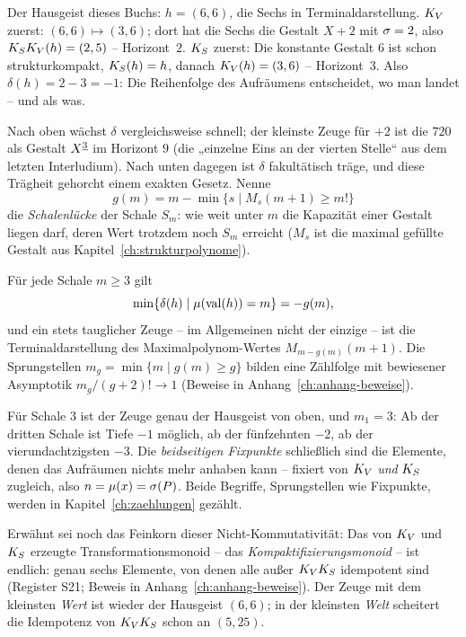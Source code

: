\begin{beispiel}
Der Hausgeist dieses Buchs: $h=(6,6)$, die Sechs in
Terminaldarstellung. $K_V$ zuerst: $(6,6)\mapsto(3,6)$; dort hat
die Sechs die Gestalt $X{+}2$ mit $\sigma=2$, also
$K_SK_V(h)=(2,5)$ -- Horizont~$2$. $K_S$ zuerst: Die konstante
Gestalt $6$ ist schon strukturkompakt, $K_S(h)=h$, danach
$K_V(h)=(3,6)$ -- Horizont~$3$. Also $\delta(h)=2-3=-1$: Die
Reihenfolge des Aufräumens entscheidet, wo man landet -- und als
was.
\end{beispiel}

Nach oben wächst $\delta$ vergleichsweise schnell; der kleinste
Zeuge für $+2$ ist die $720$ als Gestalt $X^{\underline{3}}$ im Horizont $9$
(die „einzelne Eins an der vierten Stelle“ aus dem letzten
Interludium). Nach unten dagegen ist $\delta$ fakultätisch träge,
und diese Trägheit gehorcht einem exakten Gesetz. Nenne
\[
g(m)=m-\min\{s\mid M_s(m{+}1)\ge m!\}
\]
die \emph{Schalenlücke} der Schale $S_m$: wie weit unter $m$ die
Kapazität einer Gestalt liegen darf, deren Wert trotzdem noch $S_m$
erreicht ($M_s$ ist die maximal gefüllte Gestalt aus
Kapitel~\ref{ch:strukturpolynome}).

\begin{satz}
\label{satz:tiefengesetz}
Für jede Schale $m\ge3$ gilt
\[
\min\{\delta(h)\mid \mu(\operatorname{val}(h))=m\}=-g(m),
\]
und ein stets tauglicher Zeuge -- im Allgemeinen nicht der
einzige -- ist die Terminaldarstellung des Maximalpolynom-Wertes
$M_{m-g(m)}(m{+}1)$. Die Sprungstellen $m_g=\min\{m\mid g(m)\ge g\}$
bilden eine Zählfolge mit bewiesener Asymptotik
$m_g/(g{+}2)!\to1$ (Beweise in Anhang~\ref{ch:anhang-beweise}).
\end{satz}

Für Schale $3$ ist der Zeuge genau der Hausgeist von oben, und
$m_1=3$: Ab der dritten Schale ist Tiefe $-1$ möglich, ab der
fünfzehnten $-2$, ab der vierundachtzigsten $-3$. Die
\emph{beidseitigen Fixpunkte} schließlich sind die Elemente, denen
das Aufräumen nichts mehr anhaben kann -- fixiert von $K_V$
\emph{und} $K_S$ zugleich, also $n=\mu(x)=\sigma(P)$. Beide
Begriffe, Sprungstellen wie Fixpunkte, werden in
Kapitel~\ref{ch:zaehlungen} gezählt.

Erwähnt sei noch das Feinkorn dieser Nicht-Kommutativität: Das von
$K_V$ und $K_S$ erzeugte Transformationsmonoid -- das
\emph{Kompaktifizierungsmonoid} -- ist endlich: genau sechs
Elemente, von denen alle außer $K_VK_S$ idempotent sind
(Register S21; Beweis in Anhang~\ref{ch:anhang-beweise}). Der
Zeuge mit dem kleinsten \emph{Wert} ist wieder der Hausgeist
$(6,6)$; in der kleinsten \emph{Welt} scheitert die Idempotenz von
$K_VK_S$ schon an $(5,25)$.


